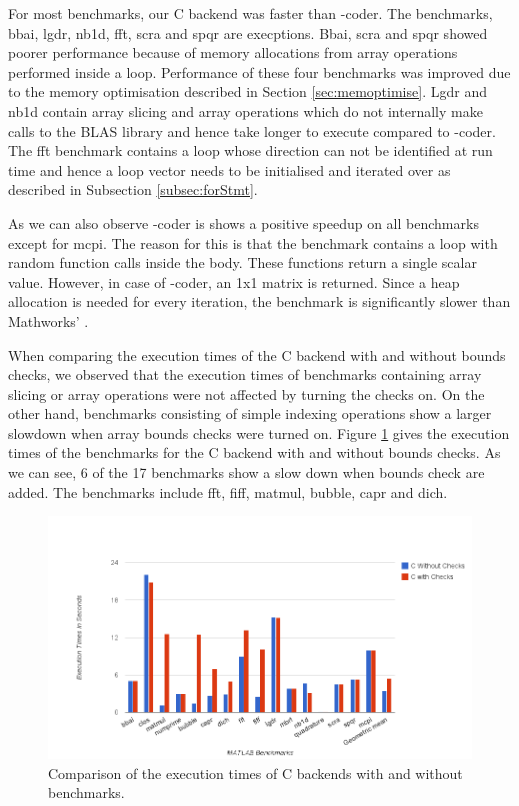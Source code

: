 For most benchmarks, our C backend was faster than \matlab-coder. The benchmarks, bbai, lgdr, nb1d, fft, scra and spqr are execptions. Bbai, scra and spqr showed poorer performance because of memory allocations from array operations performed inside a loop. Performance of these four benchmarks was improved due to the memory optimisation described in Section \ref{sec:memoptimise}. Lgdr and nb1d contain array slicing and array operations which do not internally make calls to the BLAS library and hence take longer to execute compared to \matlab-coder. The fft benchmark contains a loop whose direction can not be identified at run time and hence a loop vector needs to be initialised and iterated over as described in Subsection \ref{subsec:forStmt}. 

As we can also observe \matlab-coder is shows a positive speedup on all benchmarks except for mcpi. The reason for this is that the benchmark contains a loop with random function calls inside the body. These functions return a single scalar value. However, in case of \matlab-coder, an 1x1 matrix is returned. Since a heap allocation is needed for every iteration, the benchmark is significantly slower than Mathworks' \matlab. 

When comparing the execution times of the C backend with and without bounds checks, we observed that the execution times of benchmarks containing array slicing or array operations were not affected by turning the checks on. On the other hand, benchmarks consisting of simple indexing operations show a larger slowdown when array bounds checks were turned on. Figure \ref{fig:results_cwchecks} gives the execution times of the \matlab benchmarks for the C backend with and without bounds checks. As we can see, 6 of the 17 benchmarks show a slow down when bounds check are added. The benchmarks include fft, fiff, matmul, bubble, capr and dich. 


\begin{figure}[htbp]
\centering
\includegraphics[scale=0.5]{Figures/results_cwchecks.png}
\caption{Comparison of the execution times of C backends with and without benchmarks. }
\label{fig:results_cwchecks}
\end{figure}
